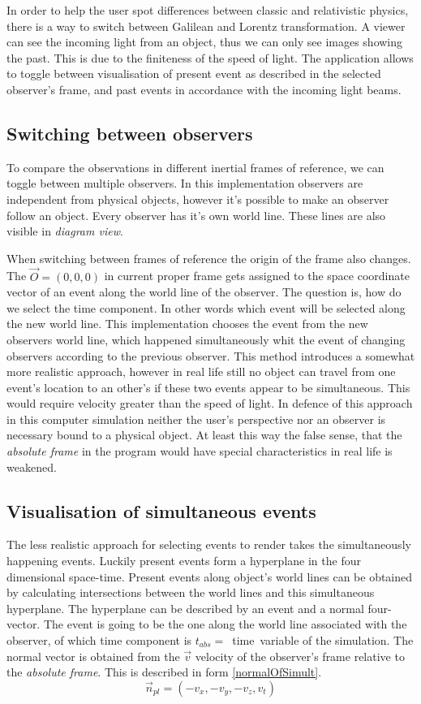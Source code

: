 \documentclass{egpubl}
\begin{document}
In order to help the user spot differences between classic and relativistic physics, there is a way to switch between Galilean \cite{KHGalilei} and Lorentz transformation. A viewer can see the incoming light from an object, thus we can only see images showing the past. This is due to the finiteness of the speed of light. The application allows to toggle between visualisation of present event as described in the selected observer's frame, and past events in accordance with the incoming light beams.

\subsection{Switching between observers}
To compare the observations in different inertial frames of reference, we can toggle between multiple observers. In this implementation observers are independent from physical objects, however it's possible to make an observer follow an object. Every observer has it's own world line. These lines are also visible in \emph{diagram view}.

When switching between frames of reference the origin of the frame also changes. The $\vec{O} =(0,0,0)$ in current proper frame gets assigned to the space coordinate vector of an event along the world line of the observer. The question is, how do we select the time component. In other words which event will be selected along the new world line. This implementation chooses the event from the new observers world line, which happened simultaneously whit the event of changing observers according to the previous observer. This method introduces a somewhat more realistic approach, however in real life still no object can travel from one event's location to an other's if these two events appear to be simultaneous. This would require velocity greater than the speed of light. In defence of this approach in this computer simulation neither the user's perspective nor an observer is necessary bound to a physical object. At least this way the false sense, that the \emph{absolute frame} in the program would have special characteristics in real life is weakened.

\subsection{Visualisation of simultaneous events}
\label{visOfSimEvents}
The less realistic approach for selecting events to render takes the simultaneously happening events. Luckily present events form a hyperplane in the four dimensional space-time. Present events along object's world lines can be obtained by calculating intersections between the world lines and this simultaneous hyperplane. The hyperplane can be described by an event and a normal four-vector. The event is going to be the one along the world line associated with the observer, of which time component is $t_{abs} =$~time~variable of the simulation. The normal vector is obtained from the $\vec{v}$ velocity of the observer's frame relative to the \emph{absolute frame}. This is described in form \ref{normalOfSimult}.
\begin{equation}
\label{normalOfSimult}
\vec{n}_{pl} = (-v_x, -v_y, -v_z, v_t)
\end{equation}
\end{document}
